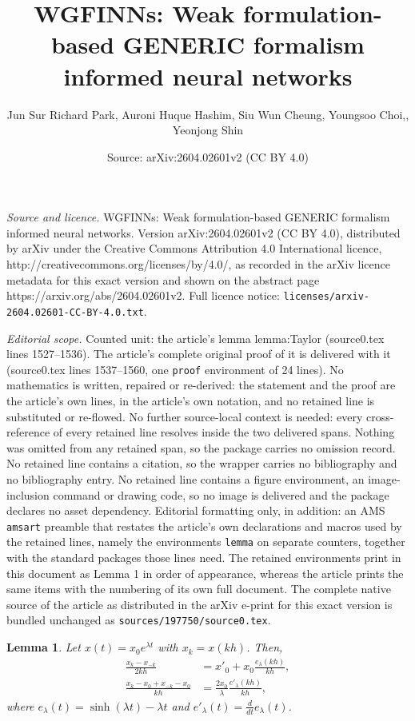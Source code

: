 \documentclass[10pt,a4paper]{amsart}
\title{WGFINNs: Weak formulation-based GENERIC formalism informed neural networks}
\author{Jun Sur Richard Park, Auroni Huque Hashim, Siu Wun Cheung, Youngsoo Choi,, Yeonjong Shin}
\date{Source: arXiv:2604.02601v2 (CC BY 4.0)}
\newtheorem{lemma}{Lemma}
\begin{document}
\maketitle

\noindent\emph{Source and licence.} WGFINNs: Weak formulation-based GENERIC formalism informed neural networks. Version arXiv:2604.02601v2 (CC BY 4.0), distributed by arXiv under the Creative Commons Attribution 4.0 International licence, http://creativecommons.org/licenses/by/4.0/, as recorded in the arXiv licence metadata for this exact version and shown on the abstract page https://arxiv.org/abs/2604.02601v2. Full licence notice: \texttt{licenses/arxiv-2604.02601-CC-BY-4.0.txt}.\par\smallskip

\noindent\textit{Editorial scope.} Counted unit: the article's lemma lemma:Taylor (source0.tex lines 1527--1536). The article's complete original proof of it is delivered with it (source0.tex lines 1537--1560, one \texttt{proof} environment of 24 lines). No mathematics is written, repaired or re-derived: the statement and the proof are the article's own lines, in the article's own notation, and no retained line is substituted or re-flowed.  No further source-local context is needed: every cross-reference of every retained line resolves inside the two delivered spans.  Nothing was omitted from any retained span, so the package carries no omission record.  No retained line contains a citation, so the wrapper carries no bibliography and no bibliography entry.  No retained line contains a figure environment, an image-inclusion command or drawing code, so no image is delivered and the package declares no asset dependency.  Editorial formatting only, in addition: an AMS \texttt{amsart} preamble that restates the article's own declarations and macros used by the retained lines, namely the environments \texttt{lemma} on separate counters, together with the standard packages those lines need.  The retained environments print in this document as Lemma 1 in order of appearance, whereas the article prints the same items with the numbering of its own full document.  The complete native source of the article as distributed in the arXiv e-print for this exact version is bundled unchanged as \texttt{sources/197750/source0.tex}.
\begin{lemma} \label{lemma:Taylor}
    Let $x(t) = x_0e^{\lambda t}$ with $x_k = x(kh)$. Then,
    \begin{align*}
        \frac{x_k - x_{-k}}{2kh} &= x'_0 + x_0\frac{e_\lambda(kh)}{kh}, \\
        \frac{x_k -x_0 + x_{-k}-x_0}{kh} &=\frac{2x_0}{\lambda} \frac{e'_\lambda(kh)}{kh},
    \end{align*}
    where $e_\lambda(t) = \sinh(\lambda t) - \lambda t$
    and $e'_\lambda(t) = \frac{d}{dt}e_\lambda(t)$.
\end{lemma}
\end{document}
